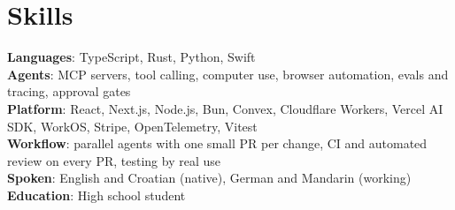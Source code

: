 \documentclass[letterpaper,11pt]{article}
\begin{document}
\section{Skills}
\begin{itemize}[leftmargin=0.15in,label={}]
  \small{\item{
    \textbf{Languages}{: TypeScript, Rust, Python, Swift} \\
    \textbf{Agents}{: MCP servers, tool calling, computer use, browser automation, evals and tracing, approval gates} \\
    \textbf{Platform}{: React, Next.js, Node.js, Bun, Convex, Cloud{f}lare Workers, Vercel AI SDK, WorkOS, Stripe, OpenTelemetry, Vitest} \\
    \textbf{{W}ork{f}low}{: parallel agents with one small PR per change, CI and automated review on every PR, testing by real use} \\
    \textbf{Spoken}{: English and Croatian (native), German and Mandarin (working)} \\
    \textbf{Education}{: High school student}
  }}
\end{itemize}
\end{document}
